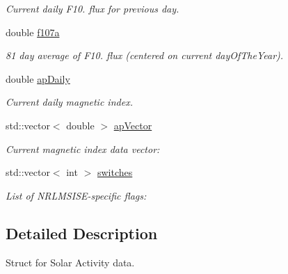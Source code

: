 \begin{DoxyCompactItemize}
\begin{DoxyCompactList}\small\item\em Current daily F10. flux for previous day. \end{DoxyCompactList}\item 
double \hyperlink{structtudat_1_1aerodynamics_1_1NRLMSISE00Input_a4a547d100e582bfcec41b07a1f2a20ed}{f107a}\hypertarget{structtudat_1_1aerodynamics_1_1NRLMSISE00Input_a4a547d100e582bfcec41b07a1f2a20ed}{}\label{structtudat_1_1aerodynamics_1_1NRLMSISE00Input_a4a547d100e582bfcec41b07a1f2a20ed}

\begin{DoxyCompactList}\small\item\em 81 day average of F10. flux (centered on current day\+Of\+The\+Year). \end{DoxyCompactList}\item 
double \hyperlink{structtudat_1_1aerodynamics_1_1NRLMSISE00Input_a3e40e49460a1a234b26d43a45af424ed}{ap\+Daily}\hypertarget{structtudat_1_1aerodynamics_1_1NRLMSISE00Input_a3e40e49460a1a234b26d43a45af424ed}{}\label{structtudat_1_1aerodynamics_1_1NRLMSISE00Input_a3e40e49460a1a234b26d43a45af424ed}

\begin{DoxyCompactList}\small\item\em Current daily magnetic index. \end{DoxyCompactList}\item 
std\+::vector$<$ double $>$ \hyperlink{structtudat_1_1aerodynamics_1_1NRLMSISE00Input_a519ac4148a97e930fea9e5a4624f3c1a}{ap\+Vector}
\begin{DoxyCompactList}\small\item\em Current magnetic index data vector\+: \end{DoxyCompactList}\item 
std\+::vector$<$ int $>$ \hyperlink{structtudat_1_1aerodynamics_1_1NRLMSISE00Input_a90237ee7bf069c7a1bf5d0135bd8638d}{switches}
\begin{DoxyCompactList}\small\item\em List of N\+R\+L\+M\+S\+I\+S\+E-\/specific flags\+: \end{DoxyCompactList}\end{DoxyCompactItemize}


\subsection{Detailed Description}
Struct for Solar Activity data. 

